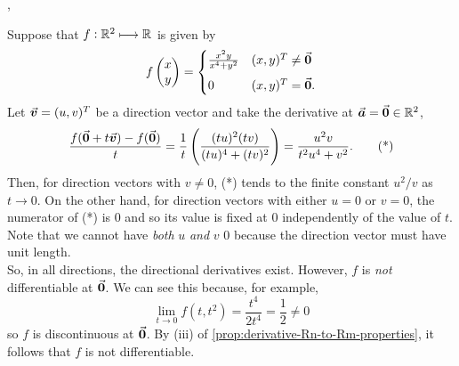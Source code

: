 \documentclass[../MathsNotesBase.tex]{subfiles}
\begin{document}
{		
		\nl[6]
		\sep
		\begin{exe}
			\ex Suppose that ${ f: \mathbb{R}^{2} \longmapsto \mathbb{R}^{} }$ is given by
			\[ f\begin{pmatrix}x\\ y\end{pmatrix} = \begin{cases}
														\frac{ x^2 y }{ x^4 + y^2 } & (x,y)^T \neq \0 \nn
														0         & (x,y)^T = \0.
													\end{cases} 
			\]
			Let ${ \vec{\bm{v}} = (u,v)^T }$ be a direction vector and take the derivative at ${ \vec{\bm{a}} = \vec{\bm{0}} \in \mathbb{R}^{2} }$,
			\[ \frac{ f(\vec{\bm{0}} + t\vec{\bm{v}}) - f(\vec{\bm{0}}) }{ t } = \frac{1}{t} \left(  \frac{ (tu)^2 (tv) }{ (tu)^4 + (tv)^2 } \right) = \frac{ u^2 v }{ t^2 u^4 + v^2 }. \tag{*} \]
			Then, for direction vectors with ${ v \neq 0 }$, (*) tends to the finite constant ${ u^2 / v }$ as ${ t \to 0 }$. On the other hand, for direction vectors with either ${ u = 0 }$ or ${ v = 0 }$, the numerator of (*) is 0 and so its value is fixed at 0 independently of the value of $t$. Note that we cannot have \textit{both} $u$ \textit{and} $v$ 0 because the direction vector must have unit length.\\
			
			So, in all directions, the directional derivatives exist. However, $f$ is \textit{not} differentiable at $\vec{\bm{0}}$. We can see this because, for example,
			\[ \lim_{t \to 0} f(t, t^2) = \frac{ t^4 }{ 2 t^4 } = \frac{1}{2} \neq 0 \]
			so $f$ is discontinuous at $\vec{\bm{0}}$. By (iii) of \autoref{prop:derivative-Rn-to-Rm-properties}, it follows that $f$ is not differentiable.
		\end{exe}
	}
  
\end{document}
